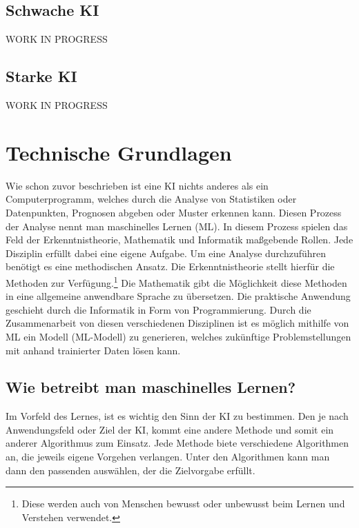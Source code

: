 \documentclass[12pt,german,ngerman]{report}
\begin{document}
    \section{Schwache KI}
        {\selectfont
            WORK IN PROGRESS
        }
    \section{Starke KI}
        {\selectfont
            WORK IN PROGRESS
        }

\chapter{Technische Grundlagen}
     Wie schon zuvor beschrieben ist eine KI nichts anderes als ein Computerprogramm,
     welches durch die Analyse von Statistiken oder Datenpunkten, Prognosen abgeben oder Muster erkennen kann.
     Diesen Prozess der Analyse nennt man maschinelles Lernen (ML).
     In diesem Prozess spielen das Feld der Erkenntnistheorie, Mathematik und Informatik 
     maßgebende Rollen. Jede Disziplin erfüllt dabei eine eigene Aufgabe.
     Um eine Analyse durchzuführen benötigt es eine methodischen Ansatz.
     Die Erkenntnistheorie stellt hierfür die Methoden zur Verfügung.\footnote{Diese werden auch von 
     Menschen bewusst oder unbewusst beim Lernen und Verstehen verwendet.}
     Die Mathematik gibt die Möglichkeit diese Methoden in eine allgemeine anwendbare Sprache zu übersetzen.
     Die praktische Anwendung geschieht durch die Informatik in Form von Programmierung.
     Durch die Zusammenarbeit von diesen verschiedenen Disziplinen ist es
     möglich mithilfe von ML ein Modell (ML-Modell) zu generieren,
     welches zukünftige Problemstellungen mit anhand trainierter Daten lösen kann.
        
    \section{Wie betreibt man maschinelles Lernen?}
        Im Vorfeld des Lernes, ist es wichtig den Sinn der KI zu bestimmen.
        Den je nach Anwendungsfeld oder Ziel der KI, kommt eine andere Methode und somit
        ein anderer Algorithmus zum Einsatz. Jede Methode biete verschiedene Algorithmen
        an, die jeweils eigene Vorgehen verlangen. Unter den Algorithmen kann man
        dann den passenden auswählen, der die Zielvorgabe erfüllt.
\end{document}
